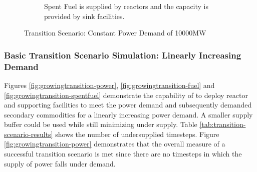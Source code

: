 \begin{figure}[]
\begin{subfigure}[t]{0.6\textwidth}
            \caption{Spent Fuel is supplied by reactors and the capacity is provided by sink facilities.}
            \label{fig:constanttransition-spentfuel}
        \end{subfigure}
        \caption{Transition Scenario: Constant Power Demand of 10000MW}
    \end{figure}

    \subsubsection{\textbf{Basic Transition Scenario Simulation: Linearly Increasing Demand}}

    Figures \ref{fig:growingtransition-power}, \ref{fig:growingtransition-fuel}
    and \ref{fig:growingtransition-spentfuel} demonstrate the capability 
    of \deploy to deploy reactor and supporting facilities to meet the
    power demand and subsequently demanded secondary commodities 
    for a linearly increasing power demand. 
    A smaller supply buffer could be used while still minimizing under supply.
    Table \ref{tab:transition-scenario-results} shows the number of 
    undersupplied timesteps. 
    Figure \ref{fig:growingtransition-power} demonstrates that
    the overall measure of a successful transition scenario is 
    met since there are no timesteps
    in which the supply of power falls under demand.
    

